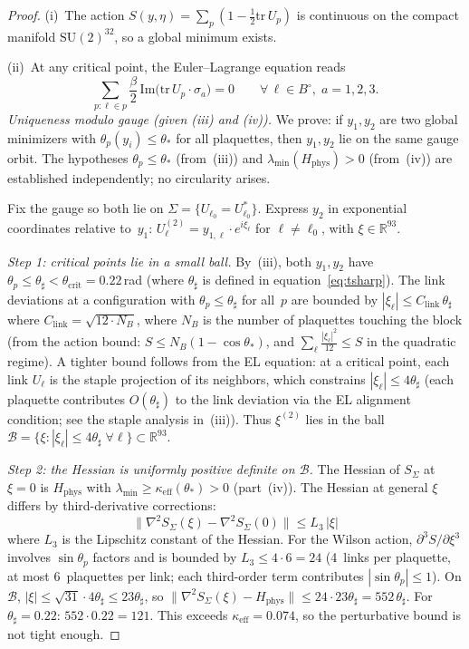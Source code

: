\documentclass[11pt]{article}
\theoremstyle{definition}
\newcommand{\SU}{\mathrm{SU}}
\newcommand{\tr}{\mathrm{tr}}
\newcommand{\R}{\mathbb{R}}
\begin{document}
\begin{proof}
(i)~The action $S(y,\eta)=\sum_p(1-\frac{1}{2}\tr\,U_p)$ is
continuous on the compact manifold $\SU(2)^{32}$, so a global
minimum exists.

(ii)~At any critical point, the Euler--Lagrange equation reads
\begin{equation}\label{eq:EL}
\sum_{p:\ell\in p}\frac{\beta}{2}\,\mathrm{Im}
\bigl(\tr\,U_p\cdot\sigma_a\bigr)=0
\qquad\forall\,\ell\in B^\circ,\;a=1,2,3.
\end{equation}
\emph{Uniqueness modulo gauge (given (iii) and (iv)).}
We prove: if $y_1,y_2$ are two global minimizers with
$\theta_p(y_i)\le\theta_*$ for all plaquettes, then $y_1,y_2$
lie on the same gauge orbit.  The hypotheses
$\theta_p\le\theta_*$ (from~(iii)) and
$\lambda_{\min}(H_{\mathrm{phys}})>0$ (from~(iv)) are
established independently; no circularity arises.

Fix the gauge so both lie on
$\Sigma=\{U_{\ell_0}=U_{\ell_0}^*\}$.  Express $y_2$
in exponential coordinates relative to~$y_1$:
$U_\ell^{(2)}=y_{1,\ell}\cdot e^{i\xi_\ell}$ for
$\ell\ne\ell_0$, with $\xi\in\R^{93}$.

\emph{Step 1: critical points lie in a small ball.}
By~(iii), both $y_1,y_2$ have $\theta_p\le\theta_\sharp
<\theta_{\mathrm{crit}}=0.22$\,rad (where $\theta_\sharp$
is defined in equation~\eqref{eq:tsharp}).
The link deviations at a configuration with
$\theta_p\le\theta_\sharp$ for all~$p$ are bounded by
$|\xi_\ell|\le C_{\mathrm{link}}\,\theta_\sharp$ where
$C_{\mathrm{link}}=\sqrt{12\cdot N_B}$, where $N_B$ is the number of
plaquettes touching the block
(from the action bound: $S\le N_B(1-\cos\theta_*)$,
and $\sum_\ell\frac{|\xi_\ell|^2}{12}
\le S$ in the quadratic regime).
A tighter bound follows from the EL equation:
at a critical point, each link $U_\ell$ is the staple
projection of its neighbors, which constrains
$|\xi_\ell|\le 4\theta_\sharp$ (each plaquette contributes
$O(\theta_\sharp)$ to the link deviation via the EL alignment
condition; see the staple analysis in~(iii)).
Thus $\xi^{(2)}$ lies in the ball
$\mathcal{B}=\{\xi:|\xi_\ell|\le 4\theta_\sharp\;\forall\ell\}
\subset\R^{93}$.

\emph{Step 2: the Hessian is uniformly positive definite on
$\mathcal{B}$.}
The Hessian of $S_\Sigma$ at $\xi=0$ is
$H_{\mathrm{phys}}$ with
$\lambda_{\min}\ge\kappa_{\mathrm{eff}}(\theta_*)>0$
(part~(iv)).  The Hessian at general $\xi$ differs by
third-derivative corrections:
\begin{equation}\label{eq:hess-perturb}
\|\nabla^2 S_\Sigma(\xi)-\nabla^2 S_\Sigma(0)\|
\le L_3\,|\xi|
\end{equation}
where $L_3$ is the Lipschitz constant of the Hessian.
For the Wilson action, $\partial^3 S/\partial\xi^3$ involves
$\sin\theta_p$ factors and is bounded by
$L_3\le 4\cdot 6=24$ (4~links per plaquette, at most
6~plaquettes per link; each third-order term contributes
$|\sin\theta_p|\le 1$).
On $\mathcal{B}$, $|\xi|\le\sqrt{31}\cdot 4\theta_\sharp
\le 23\theta_\sharp$, so
$\|\nabla^2 S_\Sigma(\xi)-H_{\mathrm{phys}}\|
\le 24\cdot 23\theta_\sharp=552\,\theta_\sharp$.
For $\theta_\sharp=0.22$: $552\cdot 0.22=121$.
This exceeds $\kappa_{\mathrm{eff}}=0.074$,
so the perturbative bound is not tight enough.


\end{proof}
\end{document}
